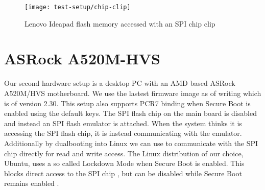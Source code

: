 \begin{figure}[htb]
    \centering
    \texttt{[image: test-setup/chip-clip]}
    \caption{Lenovo Ideapad flash memory accessed with an \acs{SPI} chip clip}
    \label{fig:lenovo-clamp}
\end{figure}

\section{ASRock A520M-HVS}
\label{sec:test-setup:asrock}

Our second hardware setup is a desktop \ac{PC} with an \ac{AMD} based ASRock A520M\-/HVS motherboard.
We use the lastest firmware image as of writing which is of version 2.30.
This setup also supports \ac{PCR}7 binding when Secure Boot is enabled using the default keys.
The \ac{SPI} flash chip on the main board is disabled and instead an  \ac{SPI} flash emulator is attached.
When the system thinks it is accessing the \ac{SPI} flash chip, it is instead communicating with the emulator.
Additionally by dualbooting into Linux we can use  to communicate with the \ac{SPI} chip directly for read and write access.
The Linux distribution of our choice, Ubuntu, uses a so called Lockdown Mode when Secure Boot is enabled.
This blocks direct access to the \ac{SPI} chip \cite{man-kernel-lockdown}, but can be disabled while Secure Boot remains enabled \cite{disable-kernel-lockdown}.
